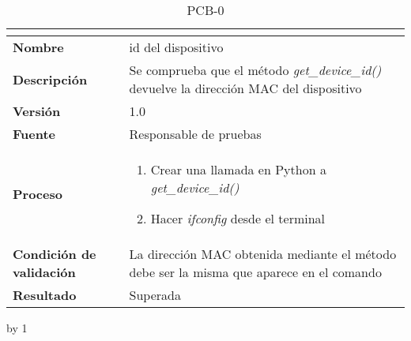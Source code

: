 \begin{table}[H]
	\caption{PCB-0\number\pcb}
	\begin{tabular}{|l|p{}|}
		\hline
		\multicolumn{2}{|c|}{\cellcolor[HTML]{BFBFBF}{\color[HTML]{000000} \textbf{PCB-0\number\pcb}}} \\ \hline
		\textbf{Nombre}                  & id del dispositivo                                                                              \\ \hline
		\textbf{Descripción}             & Se comprueba que el método \textit{get\_device\_id()} devuelve la dirección MAC del dispositivo \\ \hline
		\textbf{Versión}                 & 1.0                                                                                             \\ \hline
		\textbf{Fuente}                  & Responsable de pruebas                                                                          \\ \hline
		\textbf{Proceso}                 & \begin{enumerate}
			\item Crear una llamada en Python a \textit{get\_device\_id()}
			\item Hacer \textit{ifconfig} desde el terminal
		\end{enumerate}                                                                       \\ \hline
		\textbf{Condición de validación} & La dirección MAC obtenida mediante el método debe ser la misma que aparece en el comando        \\ \hline
		\textbf{Resultado}               & Superada                                                                                        \\ \hline
	\end{tabular}
\end{table}
\advance\pcb by 1
